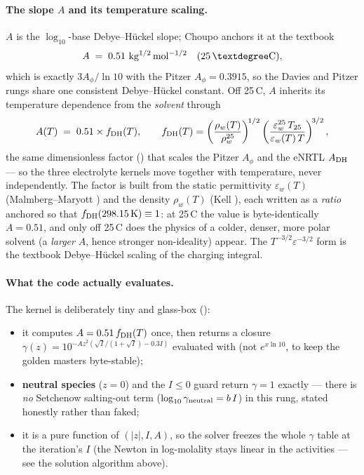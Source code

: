 \documentclass[11pt,a4paper]{article}
\begin{document}
\paragraph{The slope $A$ and its temperature scaling.}  $A$ is the
$\log_{10}$-base Debye--H\"uckel slope; Choupo anchors it at the
textbook
\[
   A \;=\; 0.51~\mathrm{kg^{1/2}\,mol^{-1/2}} \quad(25\,\textdegree\mathrm C),
\]
which is exactly $3A_\phi/\ln 10$ with the Pitzer $A_\phi=0.3915$, so the
Davies and Pitzer rungs share one consistent Debye--H\"uckel
constant.  Off 25\,\textdegree C, $A$ inherits its temperature
dependence from the \emph{solvent} through
\begin{equation}
   A(T) \;=\; 0.51 \times f_{\rm DH}(T),
   \qquad
   f_{\rm DH}(T) =
   \left(\frac{\rho_w(T)}{\rho_w^{25}}\right)^{\!1/2}
   \left(\frac{\varepsilon_w^{25}\,T_{25}}{\varepsilon_w(T)\,T}\right)^{\!3/2},
   \label{eq:davies-AT}
\end{equation}
the same dimensionless factor ()
that scales the Pitzer $A_\phi$ and the eNRTL $A_{\rm DH}$ --- so the
three electrolyte kernels move together with temperature, never
independently.  The factor is built from the static permittivity
$\varepsilon_w(T)$ (Malmberg--Maryott \cite{MalmbergMaryott1956}) and the
density $\rho_w(T)$ (Kell \cite{Kell1975}), each written as a
\emph{ratio} anchored so that $f_{\rm DH}(298.15\,\mathrm K)\equiv 1$: at
25\,\textdegree C the value is byte-identically $A=0.51$, and only off
25\,\textdegree C does the physics of a colder, denser, more polar
solvent (a \emph{larger} $A$, hence stronger non-ideality) appear.  The
$T^{-3/2}\varepsilon^{-3/2}$ form is the textbook Debye--H\"uckel scaling
of the charging integral.

\paragraph{What the code actually evaluates.}  The  kernel
is deliberately tiny and glass-box ():
\begin{itemize}[leftmargin=*,nosep,topsep=2pt]
  \item it computes $A=0.51\,f_{\rm DH}(T)$ once, then returns a closure
        $\gamma(z)=10^{-A z^2(\sqrt I/(1+\sqrt I)-0.3I)}$ evaluated with
         (not $e^{x\ln 10}$, to keep the golden
        masters byte-stable);
  \item \textbf{neutral species} ($z=0$) and the $I\le 0$ guard return
        $\gamma=1$ exactly --- there is \emph{no} Setchenow
        salting-out term ($\log_{10}\gamma_{\rm neutral}=b\,I$) in this
        rung, stated honestly rather than faked;
  \item it is a pure function of $(|z|,I,A)$, so the solver freezes the
        whole $\gamma$ table at the iteration's $I$ (the Newton in
        log-molality stays linear in the activities --- see the solution
        algorithm above).
\end{itemize}
\end{document}
